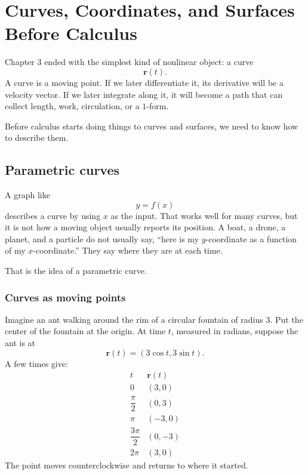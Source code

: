 
\chapter{Curves, Coordinates, and Surfaces Before Calculus}
\label{ch:4}

Chapter 3 ended with the simplest kind of nonlinear object: a curve
\[
    \mathbf r(t).
\]
A curve is a moving point.  If we later differentiate it, its derivative will be a
velocity vector.  If we later integrate along it, it will become a path that can collect
length, work, circulation, or a \(1\)-form.

Before calculus starts doing things to curves and surfaces, we need to know how to
describe them.

\section{Parametric curves}
\label{sec:4.1}

A graph like
\[
    y=f(x)
\]
describes a curve by using \(x\) as the input.  That works well for many curves, but it
is not how a moving object usually reports its position.  A boat, a drone, a planet, and
a particle do not usually say, ``here is my \(y\)-coordinate as a function of my
\(x\)-coordinate.''  They say where they are at each time.

That is the idea of a parametric curve.

\subsection{Curves as moving points}

Imagine an ant walking around the rim of a circular fountain of radius \(3\).  Put the
center of the fountain at the origin.  At time \(t\), measured in radians, suppose the
ant is at
\[
    \mathbf r(t)=(3\cos t,3\sin t).
\]
A few times give:
\[
\begin{array}{c|c}
t & \mathbf r(t) \\ \hline
0 & (3,0)\\
\dfrac{\pi}{2} & (0,3)\\
\pi & (-3,0)\\
\dfrac{3\pi}{2} & (0,-3)\\
2\pi & (3,0)
\end{array}
\]
The point moves counterclockwise and returns to where it started.

